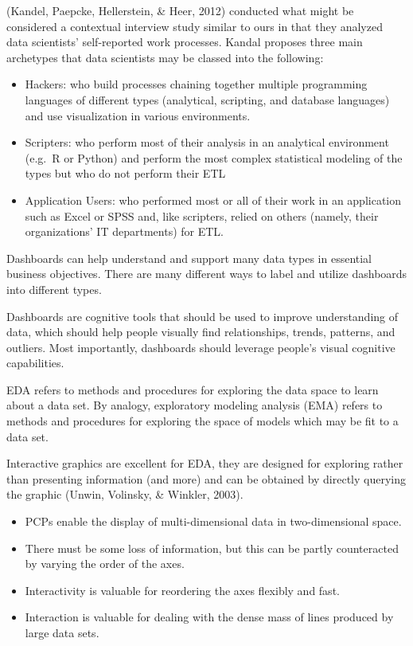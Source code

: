 \documentclass[print]{nuthesis}
\providecommand{\tightlist}{%
  \setlength{\itemsep}{0pt}\setlength{\parskip}{0pt}}
\begin{document}
(Kandel, Paepcke, Hellerstein, \& Heer, 2012) conducted what might be considered a contextual interview study similar to ours in that they analyzed data scientists' self-reported work processes. Kandal proposes three main archetypes that data scientists may be classed into the following:

\begin{itemize}
\tightlist
\item
  Hackers: who build processes chaining together multiple programming languages of different types (analytical, scripting, and database languages) and use visualization in various environments.
\item
  Scripters: who perform most of their analysis in an analytical environment (e.g.~R or Python) and perform the most complex statistical modeling of the types but who do not perform their ETL
\item
  Application Users: who performed most or all of their work in an application such as Excel or SPSS and, like scripters, relied on others (namely, their organizations' IT departments) for ETL.
\end{itemize}

Dashboards can help understand and support many data types in essential business objectives. There are many different ways to label and utilize dashboards into different types.

Dashboards are cognitive tools that should be used to improve understanding of data, which should help people visually find relationships, trends, patterns, and outliers. Most importantly, dashboards should leverage people's visual cognitive capabilities.

EDA refers to methods and procedures for exploring the data space to learn about a data set. By analogy, exploratory modeling analysis (EMA) refers to methods and procedures for exploring the space of models which may be fit to a data set.

Interactive graphics are excellent for EDA, they are designed for exploring rather than presenting information (and more) and can be obtained by directly querying the graphic (Unwin, Volinsky, \& Winkler, 2003).

\begin{itemize}
\tightlist
\item
  PCPs enable the display of multi-dimensional data in two-dimensional space.
\item
  There must be some loss of information, but this can be partly counteracted by varying the order of the axes.
\item
  Interactivity is valuable for reordering the axes flexibly and fast.
\item
  Interaction is valuable for dealing with the dense mass of lines produced by large data sets.
\end{itemize}
\end{document}
